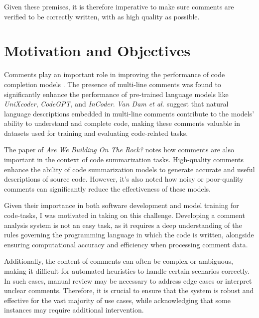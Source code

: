 \noindent Given these premises, it is therefore imperative to make sure comments are verified to be correctly written, with as high quality as possible.


\section{Motivation and Objectives}
Comments play an important role in improving the performance of code completion models \cite{vandam2023}.
The presence of multi-line comments was found to significantly enhance the performance of pre-trained language models like \textit{UniXcoder}, \textit{CodeGPT}, and \textit{InCoder}. \textit{Van Dam et al.} suggest that natural language descriptions embedded in multi-line comments contribute to the models' ability to understand and complete code, making these comments valuable in datasets used for training and evaluating code-related tasks.

\noindent The paper of \textit{Are We Building On The Rock?} \cite{buildingRock} notes how comments are also important in the context of code summarization tasks.
High-quality comments enhance the ability of code summarization models to generate accurate and useful descriptions of source code. However, it's also noted how noisy or poor-quality comments can significantly reduce the effectiveness of these models.

\noindent Given their importance in both software development and model training for code-tasks, I was motivated in taking on this challenge. Developing a comment analysis system \cite{commentAnalysis} is not an easy task, as it requires a deep understanding of the rules governing the programming language in which the code is written, alongside ensuring computational accuracy and efficiency when processing comment data.

\noindent Additionally, the content of comments can often be complex or ambiguous, making it difficult for automated heuristics to handle certain scenarios correctly. In such cases, manual review may be necessary to address edge cases or interpret unclear comments.
Therefore, it is crucial to ensure that the system is robust and effective for the vast majority of use cases, while acknowledging that some instances may require additional intervention.

